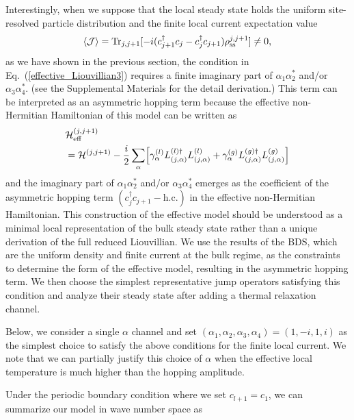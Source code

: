 \documentclass[a4paper, amsfonts, amssymb, amsmath, reprint, showkeys, nofootinbib, twoside,superscriptaddress, prl]{revtex4-2}
\newcommand{\m}[1]{\mathcal{#1}}
\newcommand{\mr}[1]{\mathrm{#1}}
\begin{document}
Interestingly, when we suppose that the local steady state holds the uniform site-resolved particle distribution and the finite local current expectation value
\begin{align}
\ev{\m{J}} = \mr{Tr}_{j, j+1}[-i(c^\dagger_{j+1}c_j-c^\dagger_j c_{j+1})\rho^{j, j+1}_{\mr{ss}}]\neq 0,\label{local_current}
\end{align}
as we have shown in the previous section, the condition in Eq.~(\ref{effective_Liouvillian3}) requires a finite imaginary part of $\alpha_1\alpha_2^*$ and/or $\alpha_3\alpha_4^*$. (see the Supplemental Materials for the detail derivation.\cite{Supple})
This term can be interpreted as an asymmetric hopping term because the effective non-Hermitian Hamiltonian of this model can be written as
\begin{align}
    &\m{H}^{(j,j+1)}_{\mr{eff}}\nonumber\\
    &= \m{H}^{(j,j+1)} -\frac{i}{2} \sum_{\alpha} \Bigl[\gamma^{(l)}_{\alpha} L^{(l)\dagger}_{(j,\alpha)} L^{(l)}_{(j,\alpha)} + \gamma^{(g)}_{\alpha} L^{(g)\dagger}_{(j,\alpha)} L^{(g)}_{(j,\alpha)}\Bigr]\nonumber
\end{align}
and the imaginary part of $\alpha_1\alpha_2^*$ and/or $\alpha_3\alpha_4^*$ emerges as the coefficient of the asymmetric hopping term $(c^\dagger_j c_{j+1} - \mr{h.c.})$ in the effective non-Hermitian Hamiltonian.
This construction of the  effective model should be understood as a minimal local representation of the bulk steady state rather than a unique derivation of the full reduced Liouvillian. We use the results of the BDS, which are the uniform density and finite current at the bulk regime, as the constraints to determine the form of the effective model, resulting in the asymmetric hopping term. We then choose the simplest representative jump operators satisfying this condition and analyze their steady state after adding a thermal relaxation channel.
 
Below, we consider a single $\alpha$ channel and set $(\alpha_1, \alpha_2, \alpha_3, \alpha_4) = (1, -i, 1, i)$ as the simplest choice to satisfy the above conditions for the finite local current. We note that we can partially justify this choice of $\alpha$ when the effective local temperature is much higher than the hopping amplitude.\cite{Supple} 

Under the periodic boundary condition where we set $c_{l+1} = c_1$, we can summarize our model in wave number space as
\end{document}
